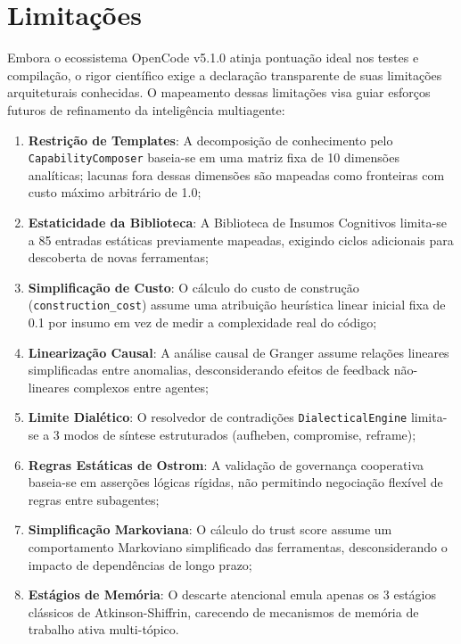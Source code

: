 \documentclass[12pt,a4paper,oneside]{abntex2}
\begin{document}
\section{Limitações}

Embora o ecossistema OpenCode v5.1.0 atinja pontuação ideal nos testes e compilação, o rigor científico exige a declaração transparente de suas limitações arquiteturais conhecidas. O mapeamento dessas limitações visa guiar esforços futuros de refinamento da inteligência multiagente:

\begin{enumerate}
    \item \textbf{Restrição de Templates}: A decomposição de conhecimento pelo \texttt{CapabilityComposer} baseia-se em uma matriz fixa de 10 dimensões analíticas; lacunas fora dessas dimensões são mapeadas como fronteiras com custo máximo arbitrário de 1.0;
    \item \textbf{Estaticidade da Biblioteca}: A Biblioteca de Insumos Cognitivos limita-se a 85 entradas estáticas previamente mapeadas, exigindo ciclos adicionais para descoberta de novas ferramentas;
    \item \textbf{Simplificação de Custo}: O cálculo do custo de construção (\texttt{construction\_cost}) assume uma atribuição heurística linear inicial fixa de 0.1 por insumo em vez de medir a complexidade real do código;
    \item \textbf{Linearização Causal}: A análise causal de Granger assume relações lineares simplificadas entre anomalias, desconsiderando efeitos de feedback não-lineares complexos entre agentes;
    \item \textbf{Limite Dialético}: O resolvedor de contradições \texttt{DialecticalEngine} limita-se a 3 modos de síntese estruturados (aufheben, compromise, reframe);
    \item \textbf{Regras Estáticas de Ostrom}: A validação de governança cooperativa baseia-se em asserções lógicas rígidas, não permitindo negociação flexível de regras entre subagentes;
    \item \textbf{Simplificação Markoviana}: O cálculo do trust score assume um comportamento Markoviano simplificado das ferramentas, desconsiderando o impacto de dependências de longo prazo;
    \item \textbf{Estágios de Memória}: O descarte atencional emula apenas os 3 estágios clássicos de Atkinson-Shiffrin, carecendo de mecanismos de memória de trabalho ativa multi-tópico.
\end{enumerate}
\end{document}
